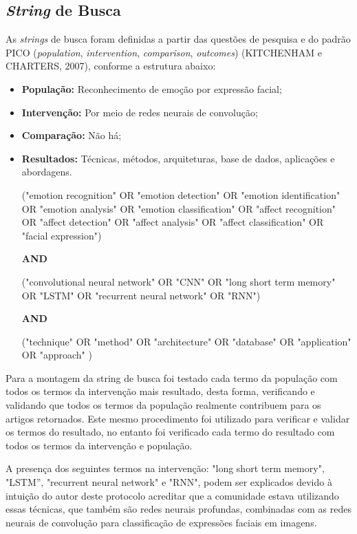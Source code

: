 \subsection{\textit{String} de Busca}\label{sec:stringdebusca} 
As \textit{strings} de busca foram definidas a partir das questões de pesquisa e do padrão PICO (\textit{population}, \textit{intervention}, \textit{comparison}, \textit{outcomes}) (KITCHENHAM e CHARTERS, 2007), conforme a estrutura abaixo:
\begin{itemize}
 \item \textbf{População:} Reconhecimento de emoção por expressão facial;
 \item \textbf{Intervenção:} Por meio de redes neurais de convolução;
 \item \textbf{Comparação:} Não há;
 \item \textbf{Resultados:} Técnicas, métodos, arquiteturas, base de dados, aplicações e abordagens.

 ("emotion recognition"  OR  "emotion detection"  OR  "emotion identification"  OR  "emotion analysis"  OR  "emotion classification"  OR  "affect recognition"  OR  "affect detection"  OR  "affect analysis"  OR  "affect classification"  OR  "facial expression")

 \textbf{AND} 

 ("convolutional neural network"  OR  "CNN"  OR  "long short term memory"  OR  "LSTM"  OR  "recurrent neural network"  OR  "RNN")  

 \textbf{AND}  

 ("technique"  OR  "method"  OR  "architecture"  OR  "database"  OR  "application"  OR  "approach" )
 
 \end{itemize}

Para a montagem da string de busca foi testado cada termo da população com todos os termos da intervenção mais resultado, desta forma, verificando e validando que todos os termos da população realmente contribuem para os artigos retornados. Este mesmo procedimento foi utilizado para verificar e validar os termos do resultado, no entanto foi verificado cada termo do resultado com todos os termos da intervenção e população. 

A presença dos seguintes termos na intervenção: "long short term memory", "LSTM”, "recurrent neural network" e "RNN", podem ser explicados devido à intuição do autor deste protocolo acreditar que a comunidade estava utilizando essas técnicas, que também são redes neurais profundas, combinadas com as redes neurais de convolução para classificação de expressões faciais em imagens.  

